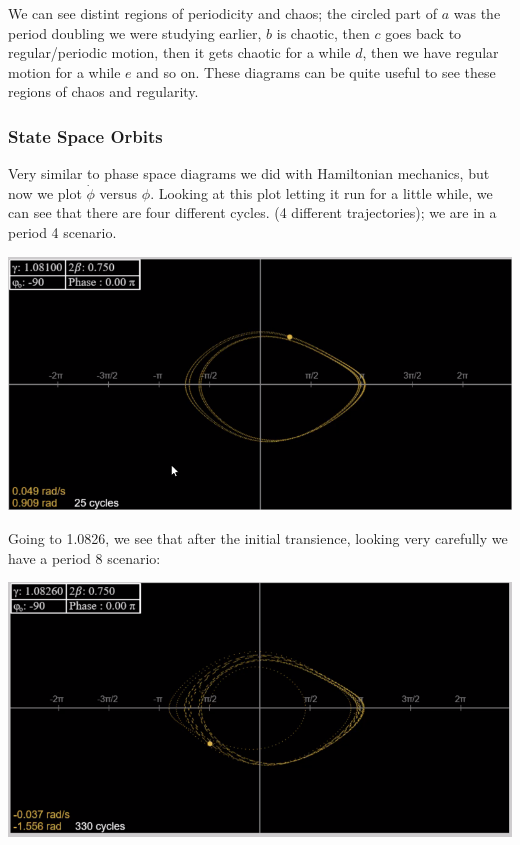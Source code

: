 We can see distint regions of periodicity and chaos; the circled part of $a$ was the period doubling we were studying earlier, $b$ is chaotic, then $c$ goes back to regular/periodic motion, then it gets chaotic for a while $d$, then we have regular motion for a while $e$ and so on. These diagrams can be quite useful to see these regions of chaos and regularity.

\subsubsection{State Space Orbits}
Very similar to phase space diagrams we did with Hamiltonian mechanics, but now we plot $\dot{\phi}$ versus $\phi$. Looking at this plot letting it run for a little while, we can see that there are four different cycles. (4 different trajectories); we are in a period 4 scenario. 
\begin{center}
    \includegraphics[scale=0.7]{Lecture-33/l33-img11.png}
\end{center}
Going to 1.0826, we see that after the initial transience, looking very carefully we have a period 8 scenario:
\begin{center}
    \includegraphics[scale=0.7]{Lecture-33/l33-img12.png}
\end{center}

